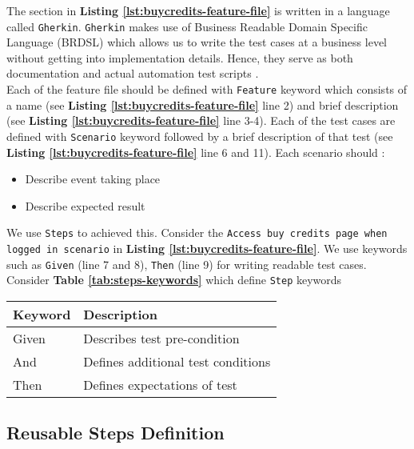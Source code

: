 The section in \textbf{Listing \ref{lst:buycredits-feature-file}} is written in a language called \texttt{Gherkin}. \texttt{Gherkin} makes use of Business Readable Domain Specific Language (BRDSL) which allows us to write the test cases at a business level without getting into implementation details. Hence, they serve as both documentation and actual automation test scripts \cite{featurefile1}.\\

Each of the feature file should be defined with \texttt{Feature} keyword which consists of a name  (see \textbf{Listing \ref{lst:buycredits-feature-file}} line  2) and brief description  (see \textbf{Listing \ref{lst:buycredits-feature-file}} line  3-4). Each of the test cases are defined with \texttt{Scenario} keyword followed by a brief description of that test (see \textbf{Listing \ref{lst:buycredits-feature-file}} line  6 and 11). Each scenario should \cite{featurefile3}:
\begin{itemize}
\item Describe event taking place
\item Describe expected result
\end{itemize}

We use \texttt{Steps} to achieved this. Consider the \texttt{Access buy credits page when logged in scenario} in \textbf{Listing \ref{lst:buycredits-feature-file}}. We use keywords such as \texttt{Given} (line 7 and 8), \texttt{Then} (line 9) for writing readable test cases. Consider \textbf{Table \ref{tab:steps-keywords}} which define \texttt{Step} keywords \cite{featurefile1}

\begin{center}
\begin{tabular}{ |p{2cm}|p{7cm}| }

 \hline
 	Keyword &
 	Description\\
 \hline
 	Given & Describes test pre-condition\\
 \hline
 	And & Defines additional test conditions\\
 \hline
 	Then & Defines expectations of test \\
 \hline

\end{tabular}
\label{tab:steps-keywords}
\end{center}


\subsection{Reusable Steps Definition}
\label{subsec:reusable-steps-definition}

